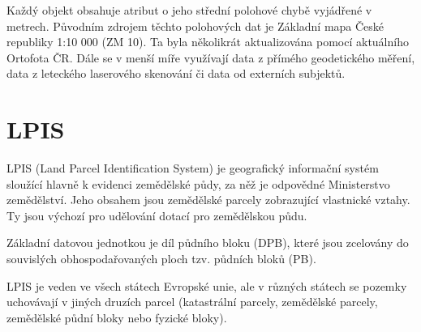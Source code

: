 \documentclass[a4paper,oneside,12pt]{book}
\begin{document}
\hspace{10mm} Každý objekt obsahuje atribut o jeho střední polohové chybě vyjádřené v metrech. Původním zdrojem těchto polohových dat je Základní mapa České republiky 1:10 000 (ZM 10). Ta byla několikrát aktualizována pomocí aktuálního Ortofota ČR. Dále se v menší míře využívají data z přímého geodetického měření, data z leteckého laserového
skenování či data od externích subjektů. \cite{nEFEg7XpI9hVQCiO} 


\section{LPIS} \label{lpis}
\hspace{10mm} LPIS (Land Parcel Identification System) je geografický informační systém sloužící hlavně k evidenci zemědělské půdy, za něž je odpovědné Ministerstvo zemědělství. Jeho obsahem jsou zemědělské parcely zobrazující vlastnické vztahy. Ty jsou výchozí pro udělování dotací pro zemědělskou půdu.\cite{Devaty2018}

\hspace{10mm} Základní datovou jednotkou je díl půdního bloku (DPB), které jsou zcelovány do souvislých obhospodařovaných ploch tzv. půdních bloků (PB). \cite{Devaty2018}

\hspace{10mm} LPIS je veden ve všech státech Evropské unie, ale v různých státech se pozemky uchovávají v jiných druzích parcel (katastrální parcely, zemědělské parcely, zemědělské půdní bloky nebo fyzické bloky). \cite{KocurBera2019}
\end{document}
